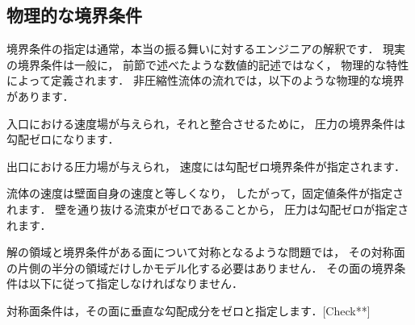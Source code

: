 \subsection{物理的な境界条件}
\label{ssec:2.6.1}
境界条件の指定は通常，本当の振る舞いに対するエンジニアの解釈です．
現実の境界条件は一般に，
前節で述べたような数値的記述ではなく，
%
物理的な特性によって定義されます．
非圧縮性流体の流れでは，以下のような物理的な境界があります．
\begin{description}
%
 \item[入口] 入口における速度場が与えられ，それと整合させるために，
            圧力の境界条件は勾配ゼロになります．
%
 \item[出口] 出口における圧力場が与えられ，
            速度には勾配ゼロ境界条件が指定されます．
%
 \item[滑りなし不浸透性壁面] 流体の速度は壁面自身の速度と等しくなり，
            したがって，固定値条件が指定されます．
            壁を通り抜ける流束がゼロであることから，
            圧力は勾配ゼロが指定されます．
\end{description}

解の領域と境界条件がある面について対称となるような問題では，
その対称面の片側の半分の領域だけしかモデル化する必要はありません．
その面の境界条件は以下に従って指定しなければなりません．
\begin{description}
%
 \item[対称面] 対称面条件は，その面に垂直な勾配成分をゼロと指定します．[Check**]
\end{description}
